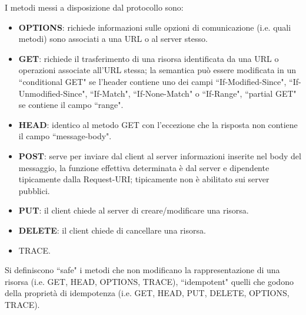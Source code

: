 \documentclass[11pt, italian, openany]{book}
\begin{document}
\begin{sloppypar}
\begin{itemize}[topsep=0pt]
	I metodi messi a disposizione dal protocollo sono:
	\vspace{-3.5mm}
	\begin{itemize}
		\itemsep-0.3em
		\item \textbf{OPTIONS}: richiede informazioni sulle opzioni di comunicazione (i.e. quali metodi) sono associati a una URL o al server stesso.
		\item \textbf{GET}: richiede il trasferimento di una risorsa identificata da una URL o operazioni associate all’URL stessa; la semantica pu\`o
		essere modificata in un ``conditional GET" se l'header contiene uno dei campi ``If-Modified-Since", ``If-Unmodified-Since", ``If-Match",
		``If-None-Match" o ``If-Range", ``partial GET" se contiene il campo ``range".
		\item \textbf{HEAD}: identico al metodo GET con l'eccezione che la risposta non contiene il campo ``message-body".
		\item \textbf{POST}: serve per inviare dal client al server informazioni inserite nel body del messaggio, la funzione effettiva determinata \`e
		dal server e dipendente tipicamente dalla Request-URI; tipicamente non \`e abilitato sui server pubblici.
		\item \textbf{PUT}: il client chiede al server di creare/modificare una risorsa.
		\item \textbf{DELETE}: il client chiede di cancellare una risorsa.
		\item TRACE.
	\end{itemize}

	Si definiscono ``safe" i metodi che non modificano la rappresentazione di una risorsa (i.e. GET, HEAD, OPTIONS, TRACE), ``idempotent" quelli che godono
	della propriet\`a di idempotenza (i.e. GET, HEAD, PUT, DELETE, OPTIONS, TRACE).


\end{itemize}
\end{sloppypar}
\end{document}
